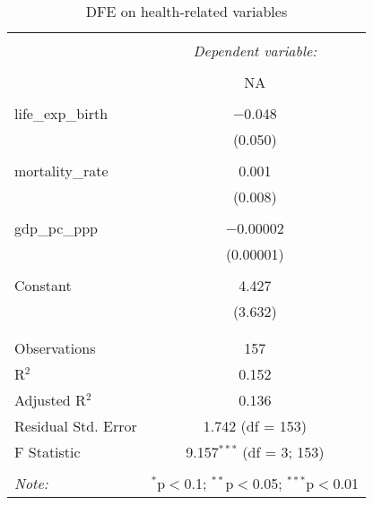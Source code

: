 
\begin{table}[!htbp] \centering 
  \caption{DFE on health-related variables} 
  \label{} 
\begin{tabular}{@{\extracolsep{5pt}}lc} 
\\[-1.8ex]\hline 
\hline \\[-1.8ex] 
 & \multicolumn{1}{c}{\textit{Dependent variable:}} \\ 
\cline{2-2} 
\\[-1.8ex] & NA \\ 
\hline \\[-1.8ex] 
 life\_exp\_birth & $-$0.048 \\ 
  & (0.050) \\ 
  & \\ 
 mortality\_rate & 0.001 \\ 
  & (0.008) \\ 
  & \\ 
 gdp\_pc\_ppp & $-$0.00002 \\ 
  & (0.00001) \\ 
  & \\ 
 Constant & 4.427 \\ 
  & (3.632) \\ 
  & \\ 
\hline \\[-1.8ex] 
Observations & 157 \\ 
R$^{2}$ & 0.152 \\ 
Adjusted R$^{2}$ & 0.136 \\ 
Residual Std. Error & 1.742 (df = 153) \\ 
F Statistic & 9.157$^{***}$ (df = 3; 153) \\ 
\hline 
\hline \\[-1.8ex] 
\textit{Note:}  & \multicolumn{1}{r}{$^{*}$p$<$0.1; $^{**}$p$<$0.05; $^{***}$p$<$0.01} \\ 
\end{tabular} 
\end{table} 
